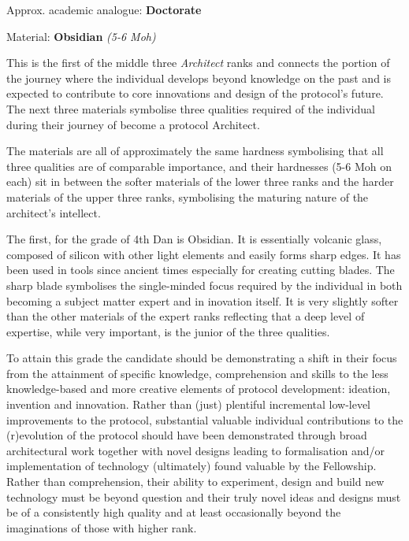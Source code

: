 \documentclass[9pt,oneside]{amsart}
\begin{document}

Approx. academic analogue: \textbf{Doctorate}

Material: \textbf{Obsidian} \emph{(5-6 Moh)}

This is the first of the middle three \emph{Architect} ranks and connects the portion of the journey where the individual develops beyond knowledge on the past and is expected to contribute to core innovations and design of the protocol's future. The next three materials symbolise three qualities required of the individual during their journey of become a protocol Architect.

The materials are all of approximately the same hardness symbolising that all three qualities are of comparable importance, and their hardnesses (5-6 Moh on each) sit in between the softer materials of the lower three ranks and the harder materials of the upper three ranks, symbolising the maturing nature of the architect's intellect.

The first, for the grade of 4th Dan is Obsidian. It is essentially volcanic glass, composed of silicon with other light elements and easily forms sharp edges. It has been used in tools since ancient times especially for creating cutting blades. The sharp blade symbolises the single-minded focus required by the individual in both becoming a subject matter expert and in inovation itself. It is very slightly softer than the other materials of the expert ranks reflecting that a deep level of expertise, while very important, is the junior of the three qualities.

To attain this grade the candidate should be demonstrating a shift in their focus from the attainment of specific knowledge, comprehension and skills to the less knowledge-based and more creative elements of protocol development: ideation, invention and innovation. Rather than (just) plentiful incremental low-level improvements to the protocol, substantial valuable individual contributions to the (r)evolution of the protocol should have been demonstrated through broad architectural work together with novel designs leading to formalisation and/or implementation of technology (ultimately) found valuable by the Fellowship. Rather than comprehension, their ability to experiment, design and build new technology must be beyond question and their truly novel ideas and designs must be of a consistently high quality and at least occasionally beyond the imaginations of those with higher rank.
\end{document}
